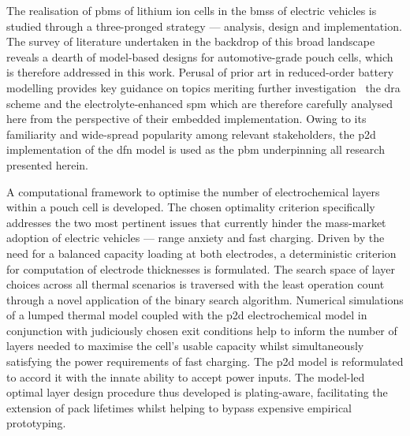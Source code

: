 

\vspace*{-10mm}

\addlines[0.5]

The  realisation of  \glspl{pbm}  of lithium  ion cells  in  the \glspl{bms}  of
electric  vehicles is  studied through  a three-pronged  strategy ---  analysis,
design  and  implementation.   The  survey  of  literature   undertaken  in  the
backdrop of  this broad landscape  reveals a  dearth of model-based  designs for
automotive-grade  pouch  cells,  which  is therefore  addressed  in  this  work.
Perusal of  prior art in  reduced-order battery modelling provides  key guidance
on  topics meriting  further  investigation \viz~the  \gls{dra}  scheme and  the
electrolyte-enhanced \gls{spm} which are  therefore carefully analysed here from
the perspective of  their embedded implementation. Owing to  its familiarity and
wide-spread popularity among relevant stakeholders, the \gls{p2d} implementation
of  the \gls{dfn}  model  is used  as the  \gls{pbm}  underpinning all  research
presented herein.

A  computational framework  to  optimise the  number  of electrochemical  layers
within a pouch  cell is developed. The chosen  optimality criterion specifically
addresses the  two most pertinent  issues that currently hinder  the mass-market
adoption of electric vehicles --- range anxiety and fast charging. Driven by the
need  for  a balanced  capacity  loading  at  both electrodes,  a  deterministic
criterion for  computation of  electrode thicknesses  is formulated.  The search
space of layer choices across all  thermal scenarios is traversed with the least
operation  count through  a novel  application of  the binary  search algorithm.
Numerical  simulations of  a lumped  thermal  model coupled  with the  \gls{p2d}
electrochemical  model in  conjunction with  judiciously chosen  exit conditions
help  to inform  the  number of  layers  needed to  maximise  the cell's  usable
capacity  whilst  simultaneously  satisfying  the  power  requirements  of  fast
charging.  The \gls{p2d}  model is  reformulated to  accord it  with the  innate
ability to  accept power  inputs. The model-led  optimal layer  design procedure
thus developed  is plating-aware, facilitating  the extension of  pack lifetimes
whilst helping to bypass expensive empirical prototyping.

